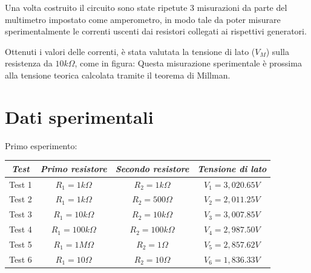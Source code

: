     Una volta costruito il circuito sono state ripetute 3 misurazioni da parte del multimetro impostato come 
    amperometro, in modo tale da poter misurare sperimentalmente le correnti uscenti dai resistori collegati ai rispettivi generatori.\par
    Ottenuti i valori delle correnti, è stata valutata la tensione di lato ($V_M$) sulla resistenza da $10k\Omega$, come in figura:
    Questa misurazione sperimentale è prossima alla tensione teorica calcolata tramite il teorema di Millman.\par



    \section{Dati sperimentali}
    \begin{center}
        Primo esperimento: \par
    \begin{tabular}{|c|c|c|c|}
        \hline
        \textit{Test} & \textit{Primo resistore} & \textit{Secondo resistore} & \textit{Tensione di lato} \\
        \hline
        Test 1 & $R_1 =1k\Omega$ & $R_2=1k\Omega$ & $V_1=3,020.65V$\\
        \hline
        Test 2 & $R_1 =1k\Omega$ & $R_2=500\Omega$ & $V_2=2,011.25V$\\
        \hline
        Test 3 & $R_1 =10k\Omega$ & $R_2=10k\Omega$ & $V_3=3,007.85V$\\
        \hline
        Test 4 & $R_1 =100k\Omega$ & $R_2=100k\Omega$ & $V_4=2,987.50V$\\
        \hline
        Test 5 & $R_1 =1M\Omega$ & $R_2=1\Omega$ & $V_5=2,857.62V$\\
        \hline
        Test 6 & $R_1 =10\Omega$ & $R_2=10\Omega$ & $V_6=1,836.33V$\\
        \hline
    
    \end{tabular}
    \end{center}
    
